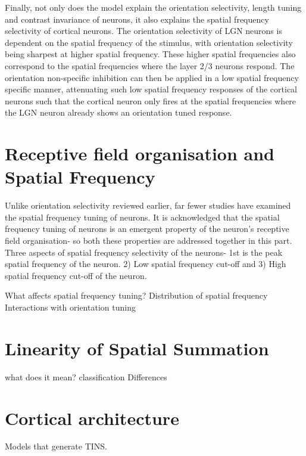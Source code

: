 Finally, not only does the model explain the orientation selectivity, length tuning and contrast invariance of neurons, it also explains the spatial frequency selectivity of cortical neurons. The orientation selectivity of LGN neurons is dependent on the spatial frequency of the stimulus, with orientation selectivity being sharpest at higher spatial frequency. These higher spatial frequencies also correspond to the spatial frequencies where the layer 2/3 neurons respond. The orientation non-specific inhibition can then be applied in a low spatial frequency specific manner, attenuating such low spatial frequency responses of the cortical neurons such that the cortical neuron only fires at the spatial frequencies where the LGN neuron already shows an orientation tuned response.


\section{Receptive field organisation and Spatial Frequency}

Unlike orientation selectivity reviewed earlier, far fewer studies have examined the spatial frequency tuning of neurons. It is acknowledged that the spatial frequency tuning of neurons is an emergent property of the neuron's receptive field organisation- so both these properties are addressed together in this part.
Three aspects of spatial frequency selectivity of the neurons- 1st is the peak spatial frequency of the neuron. 2) Low spatial frequency cut-off and 3) High spatial frequency cut-off of the neuron.


What affects spatial frequency tuning?
Distribution of spatial frequency
Interactions with orientation tuning


\section{Linearity of Spatial Summation}

what does it mean?
classification
Differences

\section{Cortical architecture}

Models that generate
TINS.
